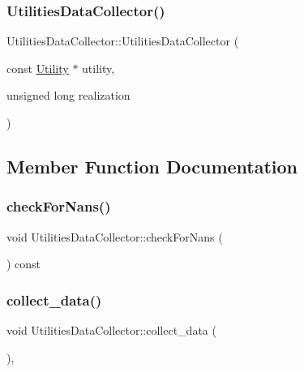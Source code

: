 \subsubsection{\texorpdfstring{Utilities\+Data\+Collector()}{UtilitiesDataCollector()}}
{\footnotesize\ttfamily Utilities\+Data\+Collector\+::\+Utilities\+Data\+Collector (\begin{DoxyParamCaption}\item[{const \mbox{\hyperlink{classUtility}{Utility}} $\ast$}]{utility,  }\item[{unsigned long}]{realization }\end{DoxyParamCaption})\hspace{0.3cm}{\ttfamily [explicit]}}



\subsection{Member Function Documentation}
\mbox{\label{classUtilitiesDataCollector_af01392bbfae02a1fd9ee65b3c97a73a3}} 
\subsubsection{\texorpdfstring{check\+For\+Nans()}{checkForNans()}}
{\footnotesize\ttfamily void Utilities\+Data\+Collector\+::check\+For\+Nans (\begin{DoxyParamCaption}{ }\end{DoxyParamCaption}) const}

\mbox{\label{classUtilitiesDataCollector_ab72c4432d6816beb1f4f4b354fb3023d}} 
\subsubsection{\texorpdfstring{collect\+\_\+data()}{collect\_data()}}
{\footnotesize\ttfamily void Utilities\+Data\+Collector\+::collect\+\_\+data (\begin{DoxyParamCaption}{ }\end{DoxyParamCaption})\hspace{0.3cm}{\ttfamily [override]}, {\ttfamily [virtual]}}



